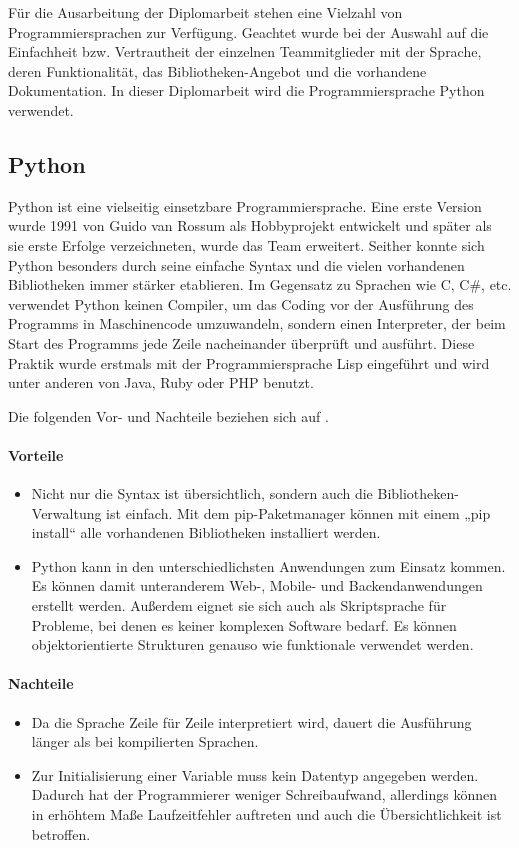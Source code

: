 Für die Ausarbeitung der Diplomarbeit stehen eine Vielzahl von Programmiersprachen zur Verfügung. Geachtet wurde bei der Auswahl auf die Einfachheit bzw. Vertrautheit der einzelnen Teammitglieder mit der Sprache, deren Funktionalität, das Bibliotheken-Angebot und die vorhandene Dokumentation. In dieser Diplomarbeit wird die Programmiersprache Python verwendet. 

\subsection{Python}
Python ist eine vielseitig einsetzbare Programmiersprache. Eine erste Version wurde 1991 von Guido van Rossum als Hobbyprojekt entwickelt und später als sie erste Erfolge verzeichneten, wurde das Team erweitert. Seither konnte sich Python besonders durch seine einfache Syntax und die vielen vorhandenen Bibliotheken immer stärker etablieren. Im Gegensatz zu Sprachen wie C, C\#, etc. verwendet Python keinen Compiler, um das Coding vor der Ausführung des Programms in Maschinencode umzuwandeln, sondern einen Interpreter, der beim Start des Programms jede Zeile nacheinander überprüft und ausführt. Diese Praktik wurde erstmals mit der Programmiersprache Lisp eingeführt und wird unter anderen von Java, Ruby oder PHP benutzt. 
\cite{Python_Software_Foundation:o.J., Pramanick_gfg:2019, Ryte:2021}

Die folgenden Vor- und Nachteile beziehen sich auf \textcite{Ceaseo:2020}.
\paragraph{Vorteile}
\begin{itemize}
	\item Nicht nur die Syntax ist übersichtlich, sondern auch die Bibliotheken-Verwaltung ist einfach. Mit dem pip-Paketmanager können mit einem „pip install“ alle vorhandenen Bibliotheken installiert werden.
	\item Python kann in den unterschiedlichsten Anwendungen zum Einsatz kommen. Es können damit unteranderem Web-, Mobile- und Backendanwendungen erstellt werden. Außerdem eignet sie sich auch als Skriptsprache für Probleme, bei denen es keiner komplexen Software bedarf. Es können objektorientierte Strukturen genauso wie funktionale verwendet werden. 
\end{itemize}

\paragraph{Nachteile}
\begin{itemize}{}{}
	\item Da die Sprache Zeile für Zeile interpretiert wird, dauert die Ausführung länger als bei kompilierten Sprachen.
	\item Zur Initialisierung einer Variable muss kein Datentyp angegeben werden. Dadurch hat der Programmierer weniger Schreibaufwand, allerdings können in erhöhtem Maße Laufzeitfehler auftreten und auch die Übersichtlichkeit ist betroffen.	
\end{itemize}

